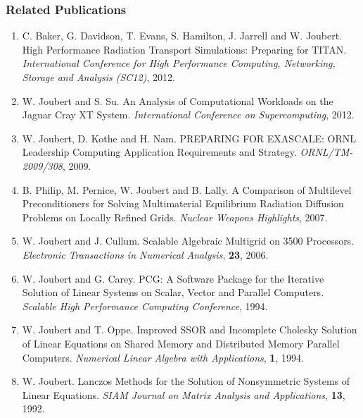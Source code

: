 \subsubsection*{Related Publications}
\begin{enumerate}
\parskip = -2pt

\item C. Baker, G. Davidson, T. Evans, S. Hamilton, J. Jarrell and W. Joubert.
   High Performance Radiation Transport Simulations: Preparing for TITAN.
   \textit{International Conference for High Performance Computing, Networking, Storage and Analysis (SC12)}, 2012.

\item W. Joubert and S. Su.
   An Analysis of Computational Workloads on the Jaguar Cray XT System.
   \textit{International Conference on Supercomputing}, 2012.

\item W. Joubert, D. Kothe and H. Nam.
      PREPARING FOR EXASCALE:  ORNL Leadership Computing Application Requirements and Strategy.
   \textit{ORNL/TM-2009/308}, 2009.

\item B. Philip, M. Pernice, W. Joubert and B. Lally.
      A Comparison of Multilevel Preconditioners for Solving Multimaterial Equilibrium Radiation Diffusion Problems on Locally Refined Grids.
   \textit{Nuclear Weapons Highlights}, 2007.

\item W. Joubert and J. Cullum.
   Scalable Algebraic Multigrid on 3500 Processors.
   \textit{Electronic Transactions in Numerical Analysis}, {\bf 23}, 2006.

\item W. Joubert and G. Carey.
   PCG: A Software Package for the Iterative Solution of Linear Systems on Scalar, Vector and Parallel Computers.
   \textit{Scalable High Performance Computing Conference}, 1994.

\item W. Joubert and T. Oppe.
   Improved SSOR and Incomplete Cholesky Solution of Linear Equations on Shared Memory and Distributed Memory Parallel Computers.
   \textit{Numerical Linear Algebra with Applications}, {\bf 1}, 1994.

\item  W. Joubert.
   Lanczos Methods for the Solution of Nonsymmetric Systems of Linear Equations.
   \textit{SIAM Journal on Matrix Analysis and Applications}, {\bf 13}, 1992.
\end{enumerate}


